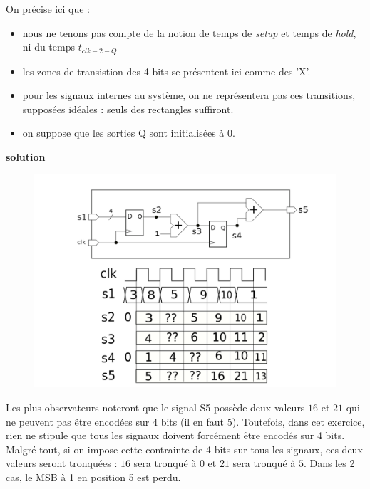 \documentclass[a4paper,11pt]{article}
\begin{document}
On précise ici que :
\begin{itemize}
\item nous ne tenons pas compte de la notion de temps de {\it setup} et temps de {\it hold}, ni du temps $t_{clk-2-Q}$
\item les zones de transistion des 4 bits se présentent ici comme des 'X'.
\item pour les signaux internes au système, on ne représentera pas ces transitions, supposées idéales : seuls des rectangles suffiront.
\item on suppose que les sorties Q sont initialisées à 0.
\end{itemize}

{\bf solution}

\begin{figure}[!h]
\begin{center}
\includegraphics[scale=0.4]{./figures/dff-1-CORR-1.png}
\end{center}
\end{figure}

Les plus observateurs noteront que le signal S5 possède deux valeurs $16$ et $21$ qui ne peuvent pas être
encodées sur 4 bits (il en faut 5). Toutefois, dans cet exercice, rien ne stipule que tous les signaux
doivent forcément être encodés sur 4 bits. Malgré tout, si on impose cette contrainte de 4 bits sur tous les
signaux, ces deux valeurs seront tronquées : $16$ sera tronqué à $0$ et $21$ sera tronqué à $5$. Dans les 2 cas, le MSB à 1 en position 5 est perdu.
\end{document}

